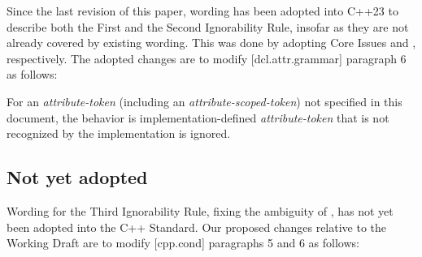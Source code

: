 Since the last revision of this paper, wording has been adopted into C++23 to describe both the First and the Second Ignorability Rule, insofar as they are not already covered by existing wording. This was done by adopting Core Issues \cite{CWG2538} and \cite{CWG2695}, respectively. The adopted changes are to modify [dcl.attr.grammar] paragraph 6 as follows:

\begin{adjustwidth}{0.5cm}{0.5cm}
For an \emph{attribute-token} (including an \emph{attribute-scoped-token})  not specified in this document, the behavior is implementation-defined \emph{attribute-token} that is not recognized by the implementation is ignored.


\end{adjustwidth}

\subsection{Not yet adopted}

Wording for the Third Ignorability Rule, fixing the ambiguity of , has not yet been adopted into the C++ Standard. Our proposed changes relative to the Working Draft \cite{N4944} are to modify [cpp.cond] paragraphs 5 and 6 as follows:

